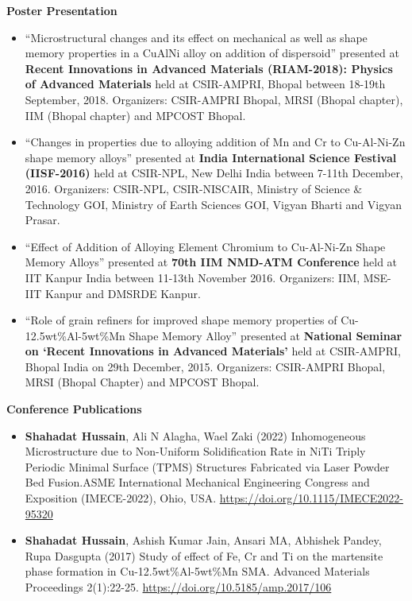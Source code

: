 \begin{cvparagraph}
\textbf{Poster Presentation}
    \begin{itemize}
    \item \textcolor{russell}{“Microstructural changes and its effect on mechanical as well as shape memory properties in a CuAlNi alloy on addition of dispersoid” presented at \textbf{Recent Innovations in Advanced Materials (RIAM-2018): Physics of Advanced Materials} held at CSIR-AMPRI, Bhopal between 18-19th September, 2018. Organizers: CSIR-AMPRI Bhopal, MRSI (Bhopal chapter), IIM (Bhopal chapter) and MPCOST Bhopal.}
 
     \item \textcolor{russell}{“Changes in properties due to alloying addition of Mn and Cr to Cu-Al-Ni-Zn shape memory alloys” presented at \textbf{India International Science Festival (IISF-2016)} held at CSIR-NPL, New Delhi India between 7-11th December, 2016. Organizers: CSIR-NPL, CSIR-NISCAIR, Ministry of Science \& Technology GOI, Ministry of Earth Sciences GOI, Vigyan Bharti and Vigyan Prasar.}
 
    \item  \textcolor{russell}{“Effect of Addition of Alloying Element Chromium to Cu-Al-Ni-Zn Shape Memory Alloys” presented at \textbf{70th IIM NMD-ATM Conference} held at IIT Kanpur India between 11-13th November 2016. Organizers: IIM, MSE-IIT Kanpur and DMSRDE Kanpur.}
 
    \item \textcolor{russell}{“Role of grain refiners for improved shape memory properties of Cu-12.5wt\%Al-5wt\%Mn Shape Memory Alloy” presented at \textbf{National Seminar on ‘Recent Innovations in Advanced Materials’} held at CSIR-AMPRI, Bhopal India on 29th December, 2015. Organizers: CSIR-AMPRI Bhopal, MRSI (Bhopal Chapter) and MPCOST Bhopal.}
    \end{itemize}
				
\textbf{Conference Publications}
    \begin{itemize}
     \item \textcolor{russell}{\textbf{Shahadat Hussain}, Ali N Alagha, Wael Zaki (2022) Inhomogeneous Microstructure due to Non-Uniform Solidification Rate in NiTi Triply Periodic Minimal Surface (TPMS) Structures Fabricated via Laser Powder Bed Fusion.ASME International Mechanical Engineering Congress and Exposition (IMECE-2022), Ohio, USA.} \newline
     \url{https://doi.org/10.1115/IMECE2022-95320}
 
     \item \textcolor{russell}{\textbf{Shahadat Hussain}, Ashish Kumar Jain, Ansari MA, Abhishek Pandey, Rupa Dasgupta (2017) Study of effect of Fe, Cr and Ti on the martensite phase formation in Cu-12.5wt\%Al-5wt\%Mn SMA. Advanced Materials Proceedings 2(1):22-25.} \url{https://doi.org/10.5185/amp.2017/106}
 

\end{itemize}
\end{cvparagraph}
